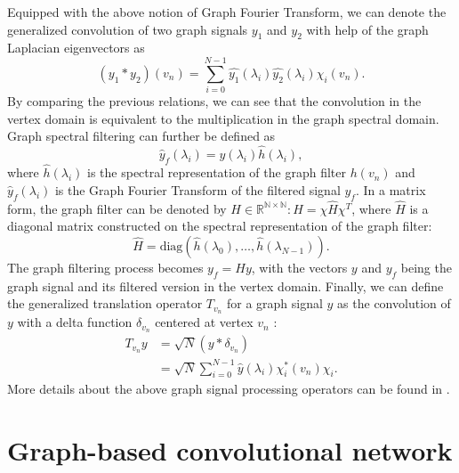 \documentclass[10pt,journal,compsoc]{IEEEtran}
\begin{document}
	Equipped with the above notion of Graph Fourier Transform, we can denote the generalized convolution of two graph signals $y_1$ and $y_2$ with help of the graph Laplacian eigenvectors as
	\begin{equation}
	(y_1 * y_2)(v_n) = \sum_{i=0}^{N-1} \hat{y_1}(\lambda_i) \hat{y_2}(\lambda_i) \chi_i (v_n).
	\label{eq:conv}
	\end{equation}
	By comparing the previous relations, we can see that the convolution in the vertex domain is equivalent to the multiplication in the graph spectral domain. Graph spectral filtering can further be defined as
	\begin{equation}
	\hat{y}_f(\lambda_i) = \hat{y}(\lambda_i) \hat{h}(\lambda_i),
	\end{equation}
	where $\hat{h}(\lambda_i)$ is the spectral representation of the graph filter $h(v_n)$ and $\hat{y}_f(\lambda_i)$ is the Graph Fourier Transform of the filtered signal $y_f$. In a matrix form, the graph filter can be denoted by $H \in \mathbb{R^{N \times N}}: H=\chi \hat{H} \chi^T$, where $\hat{H}$ is a diagonal matrix constructed on the spectral representation of the graph filter:
	\begin{equation}
	\hat{H}=\mathrm{diag} (\hat{h}(\lambda_0), \dots, \hat{h}(\lambda_{N-1})).
	\label{eq:hatH}
	\end{equation}
	The graph filtering process becomes $y_f = H y $, with the vectors $y$ and $y_f$ being the graph signal and its filtered version in the vertex domain. Finally, we can define the generalized translation operator $T_{v_n}$ for a graph signal $y$ as the convolution of $y$ with a delta function $\delta_{v_n}$ centered at vertex $v_n$ \cite{bb:thanou2014learning}:
	\begin{equation}
	\begin{array}{rl}
	T_{v_n} y & = \sqrt{N}(y * \delta_{v_n}) \\
	& =\sqrt{N}\sum_{i=0}^{N-1}\hat{y}(\lambda_i)\chi_i^*(v_n)\chi_i .
	\end{array}
	\label{eq:transl}
	\end{equation}
	More details about the above graph signal processing operators can be found in \cite{bb:shuman2013emerging}.

	\section{Graph-based convolutional network}
	\label{s:overview}
\end{document}

